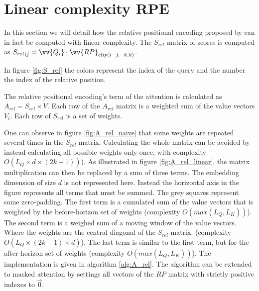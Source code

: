 \section{Linear complexity RPE}

In this section we will detail how the relative positional encoding
 proposed by \citet{shaw2018selfattention}
can in fact be computed with linear complexity. The $S_{rel}$ matrix of scores is computed as
${S_{rel}}_{ij} = \vv{Q_i} \cdot \vv{RP}_{clip(i-j, -k, k)}$.

In figure \ref{fig:S_rel} the colors represent the index of the query and the number the
index of the relative position.

The relative positional encoding's term of the attention is calculated as $A_{rel} = S_{rel} \times V$. Each row of the $A_{rel}$ matrix is a weighted sum of the value vectors $V_i$. Each row of $S_{rel}$ is a set of weights.

One can observe in figure \ref{fig:A_rel_naive} that some weights are repeated several times in the
$S_{rel}$ matrix. Calculating the whole matrix can be avoided by
instead calculating all possible weights only once, with complexity
$O \left(L_Q\times d\times(2k+1)\right)$). As illustrated in figure \ref{fig:A_rel_linear}, the matrix multiplication can then be replaced by a sum of three terms. The embedding dimension of size $d$ is not represented here. Instead the horizontal axis in the figure represents all terms that must be summed. The grey squares represent some zero-padding. The first term is a cumulated sum of the value vectors that is weighted  by the before-horizon set of weights (complexity $O(max(L_Q, L_K))$). The second term is a weighed sum of a moving window of the value vectors. Where the weights are the central diagonal of the $S_{rel}$ matrix. (complexity $O(L_Q \times (2k-1) \times d)$). The last term is similar to the first term, but for the after-horizon set of weights (complexity $O(max(L_Q, L_K))$). The implementation is given in algorithm \ref{alg:A_rel}. The algorithm can be extended to masked attention by settings all vectors of the $RP$ matrix with strictly positive indexes to $\vec{0}$.

\endinput
